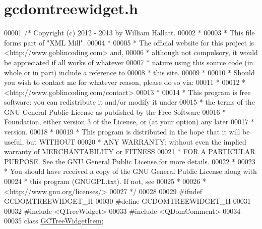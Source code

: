\hypertarget{gcdomtreewidget_8h_source}{\section{gcdomtreewidget.\-h}
}

\begin{DoxyCode}
00001 \textcolor{comment}{/* Copyright (c) 2012 - 2013 by William Hallatt.}
00002 \textcolor{comment}{ *}
00003 \textcolor{comment}{ * This file forms part of "XML Mill".}
00004 \textcolor{comment}{ *}
00005 \textcolor{comment}{ * The official website for this project is <http://www.goblincoding.com> and,}
00006 \textcolor{comment}{ * although not compulsory, it would be appreciated if all works of whatever}
00007 \textcolor{comment}{ * nature using this source code (in whole or in part) include a reference to}
00008 \textcolor{comment}{ * this site.}
00009 \textcolor{comment}{ *}
00010 \textcolor{comment}{ * Should you wish to contact me for whatever reason, please do so via:}
00011 \textcolor{comment}{ *}
00012 \textcolor{comment}{ *                 <http://www.goblincoding.com/contact>}
00013 \textcolor{comment}{ *}
00014 \textcolor{comment}{ * This program is free software: you can redistribute it and/or modify it
       under}
00015 \textcolor{comment}{ * the terms of the GNU General Public License as published by the Free
       Software}
00016 \textcolor{comment}{ * Foundation, either version 3 of the License, or (at your option) any later}
00017 \textcolor{comment}{ * version.}
00018 \textcolor{comment}{ *}
00019 \textcolor{comment}{ * This program is distributed in the hope that it will be useful, but WITHOUT}
00020 \textcolor{comment}{ * ANY WARRANTY; without even the implied warranty of MERCHANTABILITY or
       FITNESS}
00021 \textcolor{comment}{ * FOR A PARTICULAR PURPOSE.  See the GNU General Public License for more
       details.}
00022 \textcolor{comment}{ *}
00023 \textcolor{comment}{ * You should have received a copy of the GNU General Public License along with}
00024 \textcolor{comment}{ * this program (GNUGPL.txt).  If not, see}
00025 \textcolor{comment}{ *}
00026 \textcolor{comment}{ *                    <http://www.gnu.org/licenses/>}
00027 \textcolor{comment}{ */}
00028 
00029 \textcolor{preprocessor}{#ifndef GCDOMTREEWIDGET\_H}
00030 \textcolor{preprocessor}{}\textcolor{preprocessor}{#define GCDOMTREEWIDGET\_H}
00031 \textcolor{preprocessor}{}
00032 \textcolor{preprocessor}{#include <QTreeWidget>}
00033 \textcolor{preprocessor}{#include <QDomComment>}
00034 
00035 \textcolor{keyword}{class }\hyperlink{class_g_c_tree_widget_item}{GCTreeWidgetItem};

\end{DoxyCode}
